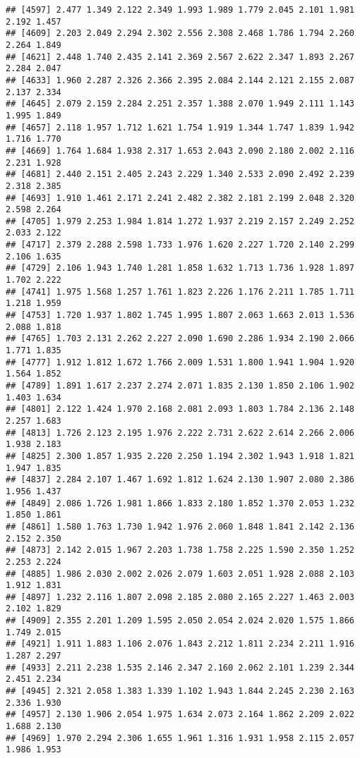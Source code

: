 \documentclass[
]{article}
\begin{document}
\begin{verbatim}
## [4597] 2.477 1.349 2.122 2.349 1.993 1.989 1.779 2.045 2.101 1.981 2.192 1.457
## [4609] 2.203 2.049 2.294 2.302 2.556 2.308 2.468 1.786 1.794 2.260 2.264 1.849
## [4621] 2.448 1.740 2.435 2.141 2.369 2.567 2.622 2.347 1.893 2.267 2.284 2.047
## [4633] 1.960 2.287 2.326 2.366 2.395 2.084 2.144 2.121 2.155 2.087 2.137 2.334
## [4645] 2.079 2.159 2.284 2.251 2.357 1.388 2.070 1.949 2.111 1.143 1.995 1.849
## [4657] 2.118 1.957 1.712 1.621 1.754 1.919 1.344 1.747 1.839 1.942 1.716 1.770
## [4669] 1.764 1.684 1.938 2.317 1.653 2.043 2.090 2.180 2.002 2.116 2.231 1.928
## [4681] 2.440 2.151 2.405 2.243 2.229 1.340 2.533 2.090 2.492 2.239 2.318 2.385
## [4693] 1.910 1.461 2.171 2.241 2.482 2.382 2.181 2.199 2.048 2.320 2.598 2.264
## [4705] 1.979 2.253 1.984 1.814 1.272 1.937 2.219 2.157 2.249 2.252 2.033 2.122
## [4717] 2.379 2.288 2.598 1.733 1.976 1.620 2.227 1.720 2.140 2.299 2.106 1.635
## [4729] 2.106 1.943 1.740 1.281 1.858 1.632 1.713 1.736 1.928 1.897 1.702 2.222
## [4741] 1.975 1.568 1.257 1.761 1.823 2.226 1.176 2.211 1.785 1.711 1.218 1.959
## [4753] 1.720 1.937 1.802 1.745 1.995 1.807 2.063 1.663 2.013 1.536 2.088 1.818
## [4765] 1.703 2.131 2.262 2.227 2.090 1.690 2.286 1.934 2.190 2.066 1.771 1.835
## [4777] 1.912 1.812 1.672 1.766 2.009 1.531 1.800 1.941 1.904 1.920 1.564 1.852
## [4789] 1.891 1.617 2.237 2.274 2.071 1.835 2.130 1.850 2.106 1.902 1.403 1.634
## [4801] 2.122 1.424 1.970 2.168 2.081 2.093 1.803 1.784 2.136 2.148 2.257 1.683
## [4813] 1.726 2.123 2.195 1.976 2.222 2.731 2.622 2.614 2.266 2.006 1.938 2.183
## [4825] 2.300 1.857 1.935 2.220 2.250 1.194 2.302 1.943 1.918 1.821 1.947 1.835
## [4837] 2.284 2.107 1.467 1.692 1.812 1.624 2.130 1.907 2.080 2.386 1.956 1.437
## [4849] 2.086 1.726 1.981 1.866 1.833 2.180 1.852 1.370 2.053 1.232 1.850 1.861
## [4861] 1.580 1.763 1.730 1.942 1.976 2.060 1.848 1.841 2.142 2.136 2.152 2.350
## [4873] 2.142 2.015 1.967 2.203 1.738 1.758 2.225 1.590 2.350 1.252 2.253 2.224
## [4885] 1.986 2.030 2.002 2.026 2.079 1.603 2.051 1.928 2.088 2.103 1.912 1.831
## [4897] 1.232 2.116 1.807 2.098 2.185 2.080 2.165 2.227 1.463 2.003 2.102 1.829
## [4909] 2.355 2.201 1.209 1.595 2.050 2.054 2.024 2.020 1.575 1.866 1.749 2.015
## [4921] 1.911 1.883 1.106 2.076 1.843 2.212 1.811 2.234 2.211 1.916 1.287 2.297
## [4933] 2.211 2.238 1.535 2.146 2.347 2.160 2.062 2.101 1.239 2.344 2.451 2.234
## [4945] 2.321 2.058 1.383 1.339 1.102 1.943 1.844 2.245 2.230 2.163 2.336 1.930
## [4957] 2.130 1.906 2.054 1.975 1.634 2.073 2.164 1.862 2.209 2.022 1.688 2.130
## [4969] 1.970 2.294 2.306 1.655 1.961 1.316 1.931 1.958 2.115 2.057 1.986 1.953

\end{verbatim}
\end{document}
